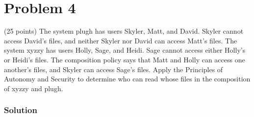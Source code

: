 \section*{Problem 4}
(25 points) The system plugh has users Skyler, Matt, and David. 
Skyler cannot access David’s files, and neither Skyler nor David can access Matt’s files. 
The system xyzzy has users Holly, Sage, and Heidi. 
Sage cannot access either Holly’s or Heidi’s files. 
The composition policy says that Matt and Holly can access one another’s files, and Skyler can access Sage's files. 
Apply the Principles of Autonomy and Security to determine who can read whose files in the composition of xyzzy and plugh.

\subsubsection*{Solution}

